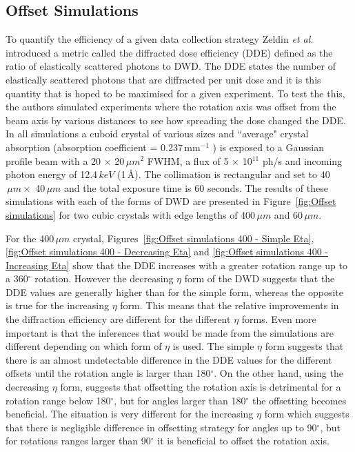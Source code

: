 \subsection{Offset Simulations}
\label{sub:Offset Simulations}
To quantify the efficiency of a given data collection strategy Zeldin \textit{et al.} introduced a metric called the diffracted dose efficiency (DDE) defined as the ratio of elastically scattered photons to DWD.
The DDE states the number of elastically scattered photons that are diffracted per unit dose and it is this quantity that is hoped to be maximised for a given experiment.
To test the this, the authors simulated experiments where the rotation axis was offset from the beam axis by various distances to see how spreading the dose changed the DDE.
In all simulations a cuboid crystal of various sizes and ``average" crystal absorption (absorption coefficient = 0.237$\,$mm$^{-1}$ \cite{zeldin2013}) is exposed to a Gaussian profile beam with a 20 $\times$ 20$\,\mu m^2$ FWHM, a flux of 5 $\times$ 10$^{11}$ ph/s and incoming photon energy of 12.4$\,keV$ (1$\,$\AA).
The collimation is rectangular and set to 40$\,\mu m \times$ 40$\,\mu m$ and the total exposure time is 60 seconds.
The results of these simulations with each of the forms of DWD are presented in Figure~\ref{fig:Offset simulations} for two cubic crystals with edge lengths of 400$\,\mu m$ and 60$\,\mu m$.

For the 400$\,\mu m$ crystal, Figures~\ref{fig:Offset simulations 400 - Simple Eta}, \ref{fig:Offset simulations 400 - Decreasing Eta} and \ref{fig:Offset simulations 400 - Increasing Eta} show that the DDE increases with a greater rotation range up to a 360$^{\circ}$ rotation.
However the decreasing $\eta$ form of the DWD suggests that the DDE values are generally higher than for the simple form, whereas the opposite is true for the increasing $\eta$ form.
This means that the relative improvements in the diffraction efficiency are different for the different $\eta$ forms.
Even more important is that the inferences that would be made from the simulations are different depending on which form of $\eta$ is used.
The simple $\eta$ form suggests that there is an almost undetectable difference in the DDE values for the different offsets until the rotation angle is larger than 180$^{\circ}$.
On the other hand, using the decreasing $\eta$ form, suggests that offsetting the rotation axis is detrimental for a rotation range below 180$^{\circ}$, but for angles larger than 180$^{\circ}$ the offsetting becomes beneficial.
The situation is very different for the increasing $\eta$ form which suggests that there is negligible difference in offsetting strategy for angles up to 90$^{\circ}$, but for rotations ranges larger than 90$^{\circ}$ it is beneficial to offset the rotation axis.

